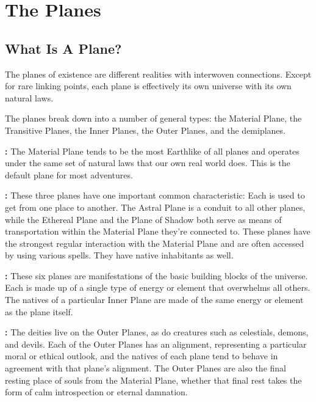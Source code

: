\section{The Planes}

\subsection{What Is A Plane?}

The planes of existence are different realities with interwoven connections. Except 
for rare linking points, each plane is effectively its own universe with its own 
natural laws. 

The planes break down into a number of general types: the Material Plane, the Transitive 
Planes, the Inner Planes, the Outer Planes, and the demiplanes.

\textbf{:} The Material Plane tends to be the most Earthlike of all 
planes and operates under the same set of natural laws that our own real world 
does. This is the default plane for most adventures.

\textbf{:} These three planes have one important common characteristic: 
Each is used to get from one place to another. The Astral Plane is a conduit to 
all other planes, while the Ethereal Plane and the Plane of Shadow both serve as 
means of transportation within the Material Plane they're connected to. These planes 
have the strongest regular interaction with the Material Plane and are often accessed 
by using various spells. They have native inhabitants as well.

\textbf{:} These six planes are manifestations of the basic building 
blocks of the universe. Each is made up of a single type of energy or element that 
overwhelms all others. The natives of a particular Inner Plane are made of the 
same energy or element as the plane itself.

\textbf{:} The deities live on the Outer Planes, as do creatures such 
as celestials, demons, and devils. Each of the Outer Planes has an alignment, representing 
a particular moral or ethical outlook, and the natives of each plane tend to behave 
in agreement with that plane's alignment. The Outer Planes are also the final resting 
place of souls from the Material Plane, whether that final rest takes the form 
of calm introspection or eternal damnation.


